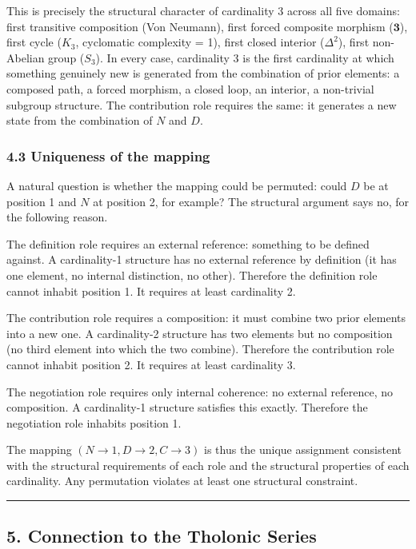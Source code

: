 \documentclass[
  11pt,
  letterpaper,
]{article}
\begin{document}
This is precisely the structural character of cardinality 3 across all
five domains: first transitive composition (Von Neumann), first forced
composite morphism (\(\mathbf{3}\)), first cycle (\(K_3\), cyclomatic
complexity = 1), first closed interior (\(\Delta^2\)), first non-Abelian
group (\(S_3\)). In every case, cardinality 3 is the first cardinality
at which something genuinely new is generated from the combination of
prior elements: a composed path, a forced morphism, a closed loop, an
interior, a non-trivial subgroup structure. The contribution role
requires the same: it generates a new state from the combination of
\(N\) and \(D\).

\subsubsection{4.3 Uniqueness of the
mapping}\label{uniqueness-of-the-mapping}

A natural question is whether the mapping could be permuted: could \(D\)
be at position 1 and \(N\) at position 2, for example? The structural
argument says no, for the following reason.

The definition role requires an external reference: something to be
defined against. A cardinality-1 structure has no external reference by
definition (it has one element, no internal distinction, no other).
Therefore the definition role cannot inhabit position 1. It requires at
least cardinality 2.

The contribution role requires a composition: it must combine two prior
elements into a new one. A cardinality-2 structure has two elements but
no composition (no third element into which the two combine). Therefore
the contribution role cannot inhabit position 2. It requires at least
cardinality 3.

The negotiation role requires only internal coherence: no external
reference, no composition. A cardinality-1 structure satisfies this
exactly. Therefore the negotiation role inhabits position 1.

The mapping \((N \to 1, D \to 2, C \to 3)\) is thus the unique
assignment consistent with the structural requirements of each role and
the structural properties of each cardinality. Any permutation violates
at least one structural constraint.

\begin{center}\rule{0.5\linewidth}{0.5pt}\end{center}

\subsection{5. Connection to the Tholonic
Series}\label{connection-to-the-tholonic-series}
\end{document}

